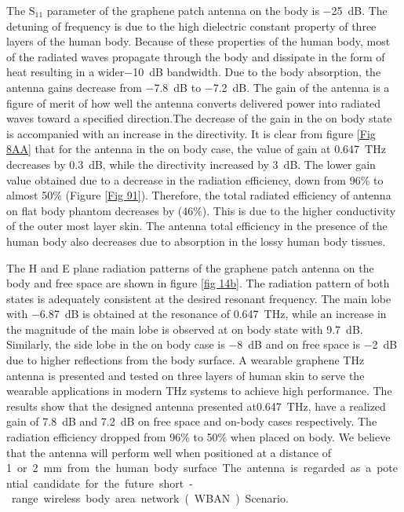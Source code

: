 \documentclass[12pt]{suhbook}
\begin{document}
The $\mathrm{S_{11}}$ parameter of the graphene patch antenna on the body is \SI{-25}{\dB}. The detuning of frequency is due to the high dielectric constant property of three layers of the human body. Because of these properties of the human body, most of the radiated waves propagate through the body and dissipate in the form of heat resulting in a wider\SI{-10}{\dB} bandwidth. Due to the body absorption, the antenna gains decrease from \SI{-7.8}{\dB}  to \SI{-7.2}{\dB}. The gain of the antenna is a figure of merit of how well the antenna converts delivered power into radiated waves toward a specified direction.The decrease of the gain in the on body state is accompanied with an increase in the directivity. It is clear from figure \ref{Fig 8AA}  that for the antenna in the on body case, the value of gain at \SI{0.647}{\THz} decreases by \SI{0.3}{\dB}, while the directivity increased by \SI{3}{\dB}. The lower gain value obtained due to a decrease in the radiation efficiency, down from 96\% to almost 50\% (Figure \ref{Fig 91}). Therefore, the total radiated efficiency of antenna on flat body phantom decreases by (46\%). This is due to the higher conductivity of the outer most layer skin. The antenna total efficiency in the presence of the human body also decreases due to absorption in the lossy human body tissues. 

The H and E plane radiation patterns of the graphene patch antenna on the body and free space are shown in figure \ref{fig 14b}. The radiation pattern of both states is adequately consistent at the desired resonant frequency. The main lobe with \SI{-6.87}{\dB} is obtained at the resonance of \SI{0.647}{\THz}, while an increase in the magnitude of the main lobe is observed at on body state with \SI{9.7}{\dB}. Similarly, the side lobe in the on body case is \SI{-8 }{\dB} and on free space is \SI{-2 }{\dB}  due to higher reflections from the body surface. A wearable graphene THz antenna is presented and tested on three layers of human skin to serve the wearable applications in modern THz systems to achieve high performance. The results show that the designed antenna presented at\SI{0.647}{\THz}, have a realized gain of \SI{7.8 }{\dB} and \SI{7.2 }{\dB} on free space and on-body cases respectively. The radiation efficiency dropped from 96\% to 50\% when placed on body. We believe that the antenna will perform well when positioned at a distance of \SI{1} or 2\mm from the human body surface. The antenna is regarded as a potential candidate for the future short-range wireless body area network (WBAN) Scenario.
% 
\end{document}
